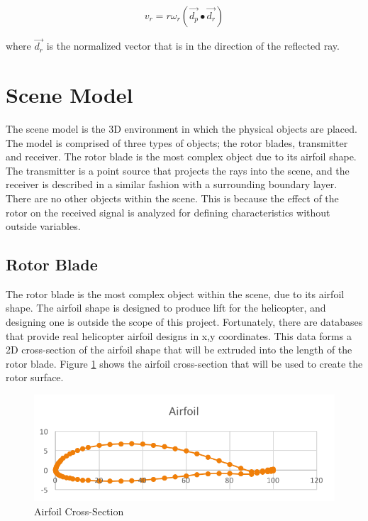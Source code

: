 \begin{equation}
	v_r = r \omega_r (\vec{d_p} \bullet \vec{d_r})
	\label{eqn:v_r}
\end{equation}

where $\vec{d_r}$ is the normalized vector that is in the direction of the reflected ray.

\section{Scene Model}
The scene model is the 3D environment in which the physical objects are placed. 
The model is comprised of three types of objects; the rotor blades, transmitter and receiver. The rotor blade is the most complex object due to its airfoil shape. The transmitter is a point source that projects the rays into the scene, and the receiver is described in a similar fashion with a surrounding boundary layer. There are no other objects within the scene. This is because the effect of the rotor on the received signal is analyzed for defining characteristics without outside variables.

\subsection{Rotor Blade}
The rotor blade is the most complex object within the scene, due to its airfoil shape. The airfoil shape is designed to produce lift for the helicopter, and designing one is outside the scope of this project. Fortunately, there are databases that provide real helicopter airfoil designs in x,y coordinates. This data forms a 2D cross-section of the airfoil shape that will be extruded into the length of the rotor blade. Figure \ref{fig:airfoil} shows the airfoil cross-section that will be used to create the rotor surface. 

\begin{figure}
	\begin{center}
		\includegraphics[width=15cm]{images/radio_propagation/2d_airfoil.png}
		\caption{Airfoil Cross-Section}
		\label{fig:airfoil}
	\end{center}
\end{figure}

